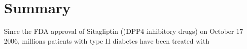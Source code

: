 \section{\label{chap:Sum} Summary}
Since the FDA approval of Sitagliptin ()DPP4 inhibitory drugs) on October 17 2006, millions patients with type II diabetes have been treated with 
